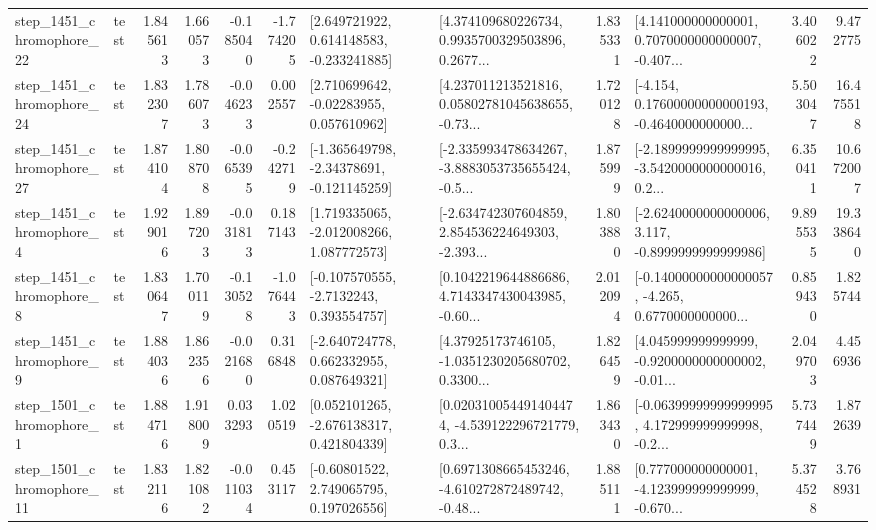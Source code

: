 \begin{tabular}{llrrrrllrlrr}
 step\_1451\_chromophore\_22 &      test &      1.845613 &    1.660573 &     -0.185040 & -1.774205 &    [2.649721922, 0.614148583, -0.233241885] &  [4.374109680226734, 0.9935700329503896, 0.2677... &       1.835331 &  [4.141000000000001, 0.7070000000000007, -0.407... &            3.406022 &          9.472775 \\
 step\_1451\_chromophore\_24 &      test &      1.832307 &    1.786073 &     -0.046233 &  0.002557 &     [2.710699642, -0.02283955, 0.057610962] &  [4.237011213521816, 0.05802781045638655, -0.73... &       1.720128 &  [-4.154, 0.17600000000000193, -0.4640000000000... &            5.503047 &         16.475518 \\
 step\_1451\_chromophore\_27 &      test &      1.874104 &    1.808708 &     -0.065395 & -0.242719 &   [-1.365649798, -2.34378691, -0.121145259] &  [-2.335993478634267, -3.8883053735655424, -0.5... &       1.875999 &  [-2.1899999999999995, -3.5420000000000016, 0.2... &            6.350411 &         10.672007 \\
  step\_1451\_chromophore\_4 &      test &      1.929016 &    1.897203 &     -0.031813 &  0.187143 &    [1.719335065, -2.012008266, 1.087772573] &  [-2.634742307604859, 2.854536224649303, -2.393... &       1.803880 &  [-2.6240000000000006, 3.117, -0.8999999999999986] &            9.895535 &         19.338640 \\
  step\_1451\_chromophore\_8 &      test &      1.830647 &    1.700119 &     -0.130528 & -1.076443 &     [-0.107570555, -2.7132243, 0.393554757] &  [0.1042219644886686, 4.7143347430043985, -0.60... &       2.012094 &  [-0.14000000000000057, -4.265, 0.6770000000000... &            0.859430 &          1.825744 \\
  step\_1451\_chromophore\_9 &      test &      1.884036 &    1.862356 &     -0.021680 &  0.316848 &    [-2.640724778, 0.662332955, 0.087649321] &  [4.37925173746105, -1.0351230205680702, 0.3300... &       1.826459 &  [4.045999999999999, -0.9200000000000002, -0.01... &            2.049703 &          4.456936 \\
  step\_1501\_chromophore\_1 &      test &      1.884716 &    1.918009 &      0.033293 &  1.020519 &    [0.052101265, -2.676138317, 0.421804339] &  [0.020310054491404474, -4.539122296721779, 0.3... &       1.863430 &  [-0.06399999999999995, 4.172999999999998, -0.2... &            5.737449 &          1.872639 \\
 step\_1501\_chromophore\_11 &      test &      1.832116 &    1.821082 &     -0.011034 &  0.453117 &     [-0.60801522, 2.749065795, 0.197026556] &  [0.6971308665453246, -4.610272872489742, -0.48... &       1.885111 &  [0.777000000000001, -4.123999999999999, -0.670... &            5.374528 &          3.768931 \\

\end{tabular}
